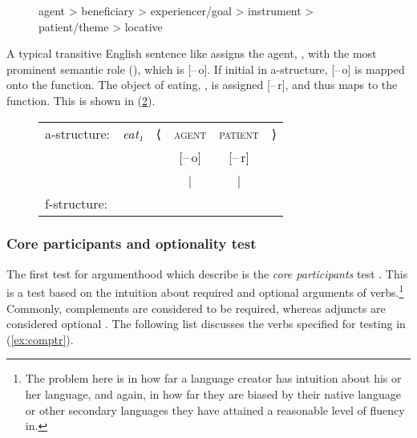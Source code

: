 \begin{figure}
\ex\label{ex:themhier2}%
	agent > beneficiary > experiencer/goal > instrument > patient/theme >
	locative
\xe
\end{figure}

A typical transitive English sentence like  assigns
the agent, , with the most prominent semantic role (\thetaroof), which
is [–\,o]. If initial in a-structure, [–\,o] is mapped onto the \Subj{}
function. The object of eating, , is assigned [–\,r], and
thus maps to the \Obj{} function. This is shown in (\ref{ex:engactive}).

\begin{figure}
\ex\label{ex:engactive}
\begin{tabular}[t]{l >{\itshape}l l c c r}
a-structure:
	& eat₁
	& ⟨
	& \textsc{agent}
	& \textsc{patient}
	& ⟩
	\\
%
	& %
	& %
	& [–\,o]
	& [–\,r]
	& %
	\\

%
	& %
	& %
	& |
	& |
	& %
	\\

f-structure:
	& %
	& %
	& \Subj
	& \Obj
	& %
	\\
\end{tabular}
\xe
\end{figure}

\subsubsection{Core participants and optionality test}

The first test for argumenthood which \citet{needhamtoivonen2011} describe is
the \emph{core participants} test \citep[404]{needhamtoivonen2011}. This is a
test based on the intuition about required and optional arguments of
verbs.\footnote{The problem here is in how far a language creator has intuition
about his or her language, and again, in how far they are biased by their
native language or other secondary languages they have attained a reasonable
level of fluency in.} Commonly, complements are considered to be required,
whereas adjuncts are considered optional \citep[405--407]{needhamtoivonen2011}.
The following list discusses the verbs specified for testing in
(\ref{ex:comptr}).

